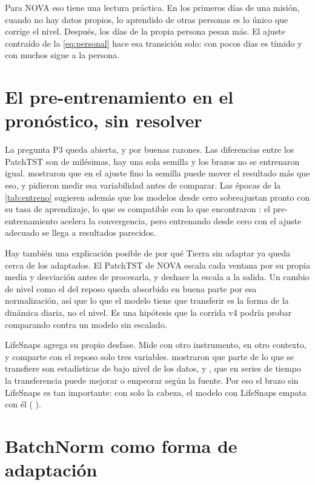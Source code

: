 Para NOVA eso tiene una lectura práctica. En los primeros días de una misión, cuando no hay datos propios, lo aprendido
de otras personas es lo único que corrige el nivel. Después, los días de la propia persona pesan más. El ajuste
contraído de la \cref{eq:personal} hace esa transición solo: con pocos días es tímido y con muchos sigue a la persona.

\section{El pre-entrenamiento en el pronóstico, sin resolver}

La pregunta P3 queda abierta, y por buenas razones. Las diferencias entre los PatchTST son de milésimas, hay una sola
semilla y los brazos no se entrenaron igual. \textcite{dodge2020} mostraron que en el ajuste fino la semilla puede
mover el resultado más que eso, y \textcite{bouthillier2021} pidieron medir esa variabilidad antes de comparar. Las
épocas de la \cref{tab:entreno} sugieren además que los modelos desde cero sobreajustan pronto con su tasa de
aprendizaje, lo que es compatible con lo que encontraron \textcite{he2019}: el pre-entrenamiento acelera la
convergencia, pero entrenando desde cero con el ajuste adecuado se llega a resultados parecidos.

Hay también una explicación posible de por qué Tierra sin adaptar ya queda cerca de los adaptados. El PatchTST de
NOVA escala cada ventana por su propia media y desviación antes de procesarla, y deshace la escala a la salida. Un
cambio de nivel como el del reposo queda absorbido en buena parte por esa normalización, así que lo que el modelo tiene
que transferir es la forma de la dinámica diaria, no el nivel. Es una hipótesis que la corrida v4 podría probar
comparando contra un modelo sin escalado.

LifeSnaps agrega su propio desfase. Mide con otro instrumento, en otro contexto, y comparte con el reposo solo tres
variables. \textcite{neyshabur2020} mostraron que parte de lo que se transfiere son estadísticas de bajo nivel de los
datos, y \textcite{fawaz2018}, que en series de tiempo la transferencia puede mejorar o empeorar según la fuente. Por
eso el brazo sin LifeSnaps es tan importante: con solo la cabeza, el modelo con LifeSnaps empata con él
( ).

\section{BatchNorm como forma de adaptación}

